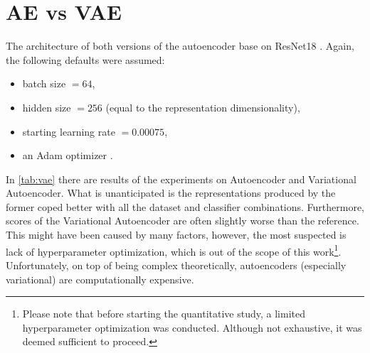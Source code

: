 \section{AE vs VAE}
The architecture of both versions of the autoencoder base on ResNet18 \cite{He2016}. Again, the following defaults were assumed:
\begin{itemize}
    \item batch size $=64$,
    \item hidden size $=256$ (equal to the representation dimensionality),
    \item starting learning rate $=0.00075$,
    \item an Adam optimizer \cite{Kingma2014}.
\end{itemize}

In \autoref{tab:vae} there are results of the experiments on Autoencoder and Variational Autoencoder. What is unanticipated is the representations produced by the former coped better with all the dataset and classifier combinations. Furthermore, scores of the Variational Autoencoder are often slightly worse than the reference. This might have been caused by many factors, however, the most suspected is lack of hyperparameter optimization, which is out of the scope of this work\footnote{Please note that before starting the quantitative study, a limited hyperparameter optimization was conducted. Although not exhaustive, it was deemed sufficient to proceed.}. Unfortunately, on top of being complex theoretically, autoencoders (especially variational) are computationally expensive.


